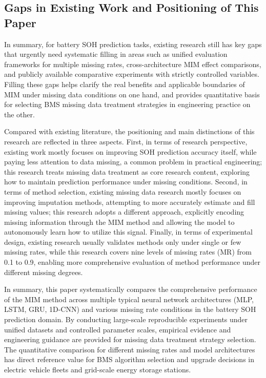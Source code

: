 \documentclass[10pt,a4paper]{article}
\begin{document}
\subsection{Gaps in Existing Work and Positioning of This Paper}

In summary, for battery SOH prediction tasks, existing research still has key gaps that urgently need systematic filling in areas such as unified evaluation frameworks for multiple missing rates, cross-architecture MIM effect comparisons, and publicly available comparative experiments with strictly controlled variables. Filling these gaps helps clarify the real benefits and applicable boundaries of MIM under missing data conditions on one hand, and provides quantitative basis for selecting BMS missing data treatment strategies in engineering practice on the other.

Compared with existing literature, the positioning and main distinctions of this research are reflected in three aspects. First, in terms of research perspective, existing work mostly focuses on improving SOH prediction accuracy itself, while paying less attention to data missing, a common problem in practical engineering; this research treats missing data treatment as core research content, exploring how to maintain prediction performance under missing conditions. Second, in terms of method selection, existing missing data research mostly focuses on improving imputation methods, attempting to more accurately estimate and fill missing values; this research adopts a different approach, explicitly encoding missing information through the MIM method and allowing the model to autonomously learn how to utilize this signal. Finally, in terms of experimental design, existing research usually validates methods only under single or few missing rates, while this research covers nine levels of missing rates (MR) from 0.1 to 0.9, enabling more comprehensive evaluation of method performance under different missing degrees.

In summary, this paper systematically compares the comprehensive performance of the MIM method across multiple typical neural network architectures (MLP, LSTM, GRU, 1D-CNN) and various missing rate conditions in the battery SOH prediction domain. By conducting large-scale reproducible experiments under unified datasets and controlled parameter scales, empirical evidence and engineering guidance are provided for missing data treatment strategy selection. The quantitative comparison for different missing rates and model architectures has direct reference value for BMS algorithm selection and upgrade decisions in electric vehicle fleets and grid-scale energy storage stations.
\end{document}
